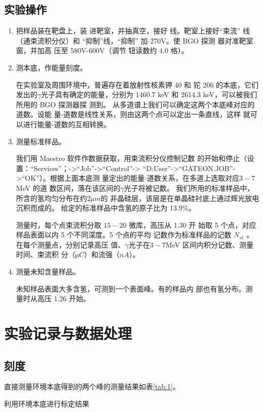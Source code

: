 \documentclass{article}
\begin{document}
\subsection{实验操作}
\begin{enumerate}
\item 把样品装在靶盘上，装
进靶室，并抽真空，接好
线。靶室上接好“束流”
线（通束流积分仪）和
“抑制”线，“抑制”
加-270V。使 BGO 探测
器对准靶室窗，并加高
压至 580V-600V（调节
钮读数约 4.0 格）。
\item 测本底，作能量刻度。

在实验室及周围环境中，普遍存在着放射性核素钾 40 和
铊 206 的本底，它们发出的$\gamma$光子具有确定的能量，分别为
1460.7 keV 和 2614.3 keV，可以被我们所用的 BGO 探测器探
测到。
从多道谱上我们可以确定这两个本底峰对应的道数。设能
量-道数是线性关系，则由这两个点可以定出一条直线，这样
就可以进行能量-道数的互相转换。

\item 测量标准样品。

我们用 Maestro 软件作数据获取，用束流积分仪控制记数
的开始和停止（设置：“Services”；->“Job”->“Control”->
“D:User”->“GATEON.JOB”->“OK”）。根据上面本底测
量定出的能量-道数关系，在多道上选取对应$3-7$MeV 的道
数区间，落在该区间的$\gamma$光子将被记数。
我们所用的标准样品中，所含的氢均匀分布在约$2\si{\micro m}$的
非晶硅层，该层是在单晶硅衬底上通过辉光放电沉积而成的。
给定的标准样品中含氢的原子比为 13.9\%。

测量时，每个点束流积分取 $15-20$ 微库，高压从 1.30 开
始取 5 个点，对应样品表面以内 5 个不同深度。5 个点的平均
记数作为标准样品的记数 $N_{st}$ 。在每个测量点，分别记录高压
值、$\gamma$光子在$3-7$MeV 区间内积分记数、测量时间、束流积
分（$\si{\micro C}$）和流强（$\si{nA}$）。
\item 测量未知含量样品。

未知样品表面大多含氢，可测到一个表面峰。有的样品内
部也有氢分布。测量时从高压 1.26 开始。
 
\end{enumerate}

\section{实验记录与数据处理}
\subsection{刻度}
直接测量环境本底得到的两个峰的测量结果如表\ref{tab:1}。
\begin{table}[htbp]
  \centering
  \caption{利用环境本底进行标定结果\label{tab:1}}
  
\end{table}
\end{document}
